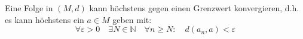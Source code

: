 Eine Folge in $(M, d)$ kann höchstens gegen einen Grenzwert konvergieren, d.h. es kann höchstens ein $a \in M$ geben mit:
$$
\forall \varepsilon > 0 \quad 
\exists N \in \mathbb{N} \quad 
\forall n \geq N : \quad 
d(a_n, a) < \varepsilon
$$